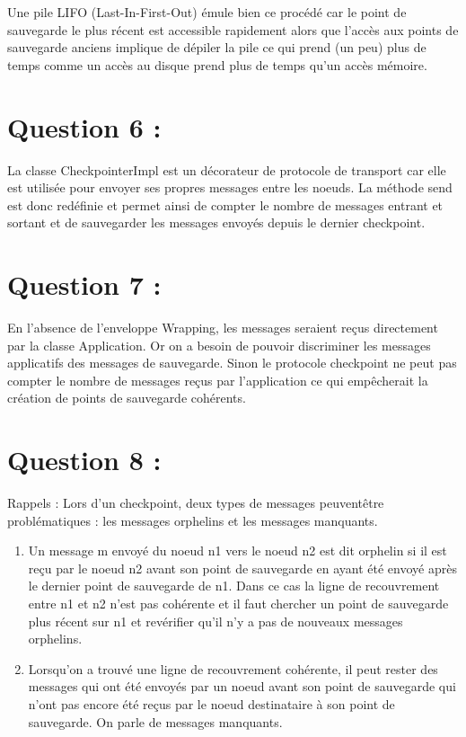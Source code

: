 \documentclass[11pt,a4paper]{report}
\begin{document}
Une pile LIFO (Last-In-First-Out) émule bien ce procédé car le point de sauvegarde le plus récent est accessible rapidement alors que l'accès aux points de sauvegarde anciens implique de dépiler la pile ce qui prend (un peu) plus de temps comme un accès au disque prend plus de temps qu'un accès mémoire.\\


\section{Question 6 :}

La classe CheckpointerImpl est un décorateur de protocole de transport car elle est utilisée pour envoyer ses propres messages entre les noeuds. La méthode send est donc redéfinie et permet ainsi de compter le nombre de messages entrant et sortant et de sauvegarder les messages envoyés depuis le dernier checkpoint.\\


\section{Question 7 :}

En l'absence de l'enveloppe Wrapping, les messages seraient reçus directement par la classe Application. Or on a besoin de pouvoir discriminer les messages applicatifs des messages de sauvegarde. Sinon le protocole checkpoint ne peut pas compter le nombre de messages reçus par l'application ce qui empêcherait la création de points de sauvegarde cohérents.\\


\section{Question 8 :}

Rappels :
Lors d'un checkpoint, deux types de messages peuvent\-être problématiques : les messages orphelins et les messages manquants.\\
\begin{enumerate}
\item Un message m envoyé du noeud n1 vers le noeud n2 est dit orphelin si il est reçu par le noeud n2 avant son point de sauvegarde en ayant été envoyé après le dernier point de sauvegarde de n1. Dans ce cas la ligne de recouvrement entre n1 et n2 n'est pas cohérente et il faut chercher un point de sauvegarde plus récent sur n1 et revérifier qu'il n'y a pas de nouveaux messages orphelins.
\item Lorsqu'on a trouvé une ligne de recouvrement cohérente, il peut rester des messages qui ont été envoyés par un noeud avant son point de sauvegarde qui n'ont pas encore été reçus par le noeud destinataire à son point de sauvegarde. On parle de messages manquants.
\end{enumerate}\\
\end{document}
